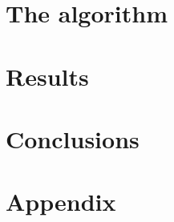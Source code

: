 \documentclass[reqno]{siamart220329}
\begin{document}
\section{The algorithm}
\label{sec-algo}

\section{Results}\label{sec-steady-res}



\section{Conclusions}
\label{sec-conclusions}


\section{Appendix}
\label{sec-appendix}





\end{document}
